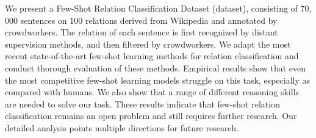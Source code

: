 We present a Few-Shot Relation Classification Dataset (dataset), consisting of 70, 000 sentences on 100 relations derived from Wikipedia and annotated by crowdworkers. The relation of each sentence is first recognized by distant supervision methods, and then filtered by crowdworkers. We adapt the most recent state-of-the-art few-shot learning methods for relation classification and conduct thorough evaluation of these methods. Empirical results show that even the most competitive few-shot learning models struggle on this task, especially as compared with humans. We also show that a range of different reasoning skills are needed to solve our task. These results indicate that few-shot relation classification remains an open problem and still requires further research. Our detailed analysis points multiple directions for future research.
